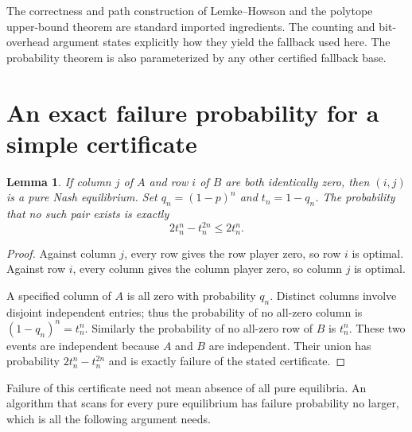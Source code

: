 \documentclass[11pt]{article}
\newtheorem{lemma}[theorem]{Lemma}
\theoremstyle{remark}
\begin{document}
The correctness and path construction of Lemke--Howson and the polytope upper-bound theorem are standard imported ingredients. The counting and bit-overhead argument states explicitly how they yield the fallback used here. The probability theorem is also parameterized by any other certified fallback base.

\section{An exact failure probability for a simple certificate}
\begin{lemma}\label{zero}
If column $j$ of $A$ and row $i$ of $B$ are both identically zero, then $(i,j)$ is a pure Nash equilibrium. Set $q_n=(1-p)^n$ and $t_n=1-q_n$. The probability that no such pair exists is exactly
\[
 2t_n^n-t_n^{2n}\leq2t_n^n.
\]
\end{lemma}
\begin{proof}
Against column $j$, every row gives the row player zero, so row $i$ is optimal. Against row $i$, every column gives the column player zero, so column $j$ is optimal.

A specified column of $A$ is all zero with probability $q_n$. Distinct columns involve disjoint independent entries; thus the probability of no all-zero column is $(1-q_n)^n=t_n^n$. Similarly the probability of no all-zero row of $B$ is $t_n^n$. These two events are independent because $A$ and $B$ are independent. Their union has probability $2t_n^n-t_n^{2n}$ and is exactly failure of the stated certificate.
\end{proof}

Failure of this certificate need not mean absence of all pure equilibria. An algorithm that scans for every pure equilibrium has failure probability no larger, which is all the following argument needs.
\end{document}
